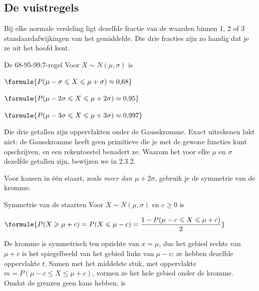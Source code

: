 \begin{oefeningen}
\end{oefeningen}

\subsection{De vuistregels}

Bij elke normale verdeling ligt dezelfde fractie van de waarden binnen 1, 2 of 3 standaardafwijkingen van het gemiddelde. Die drie fracties zijn zo handig dat je ze uit het hoofd kent.

\begin{theorie}
\begin{stelling}{De 68-95-99,7-regel}
Voor $X \sim N(\mu, \sigma)$ is

\vspace{1mm}
\qquad $\formule{P(\mu - \sigma \leqslant X \leqslant \mu + \sigma) \approx 0{,}68}$

\vspace{.5mm}
\qquad $\formule{P(\mu - 2\sigma \leqslant X \leqslant \mu + 2\sigma) \approx 0{,}95}$

\vspace{.5mm}
\qquad $\formule{P(\mu - 3\sigma \leqslant X \leqslant \mu + 3\sigma) \approx 0{,}997}$
\end{stelling}
\end{theorie}

Die drie getallen zijn oppervlakten onder de Gausskromme. Exact uitrekenen lukt niet: de Gausskromme heeft geen primitieve die je met de gewone functies kunt opschrijven, en een rekentoestel benadert ze. Waarom het voor elke $\mu$ en $\sigma$ dezelfde getallen zijn, bewijzen we in 2.3.2.

Voor kansen in één staart, zoals \textit{meer dan $\mu + 2\sigma$}, gebruik je de symmetrie van de kromme.

\begin{theorie}
\begin{stelling}{Symmetrie van de staarten}
Voor $X \sim N(\mu, \sigma)$ en $c \geqslant 0$ is

\vspace{1mm}
\qquad $\formule{P(X \geqslant \mu + c) = P(X \leqslant \mu - c) = \dfrac{1 - P(\mu - c \leqslant X \leqslant \mu + c)}{2}}$
\end{stelling}

\begin{bewijs}
De kromme is symmetrisch ten opzichte van $x = \mu$, dus het gebied rechts van $\mu + c$ is het spiegelbeeld van het gebied links van $\mu - c$: ze hebben dezelfde oppervlakte $t$. Samen met het middelste stuk, met oppervlakte $m = P(\mu - c \leqslant X \leqslant \mu + c)$, vormen ze het hele gebied onder de kromme. Omdat de grenzen geen kans hebben, is
\end{bewijs}
\end{theorie}

